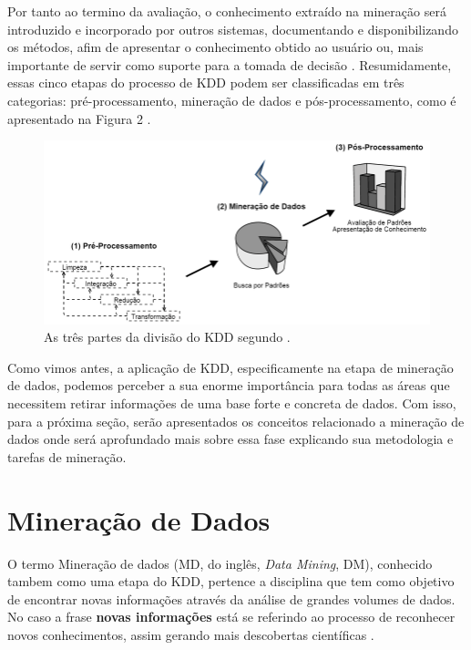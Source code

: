 \par
Por tanto ao termino da avaliação, o conhecimento extraído na mineração será introduzido e incorporado por outros sistemas, documentando e disponibilizando os métodos, afim  de apresentar o conhecimento obtido ao usuário ou, mais importante de servir como suporte para a tomada de decisão \cite{Kampff2013}. Resumidamente, essas cinco etapas do processo de KDD podem ser classificadas em três categorias: pré-processamento, mineração de dados e pós-processamento, como é apresentado na Figura 2 \cite{Fayyad1996}.

\begin{figure}[!htp]
	\begin{center}
    \caption{\label{fig:waveform_fig}As três partes da divisão do KDD segundo \cite{Fayyad1996}.}
	\includegraphics[scale=0.55]{Figuras/Tres_partes_KDD.png}
	\end{center}
\end{figure}

\par
Como vimos antes, a aplicação de KDD, especificamente na etapa de mineração de dados, podemos perceber a sua enorme importância para todas as áreas que necessitem retirar informações de uma base forte e concreta de dados. Com isso, para a próxima seção, serão apresentados os conceitos relacionado a mineração de dados onde será aprofundado mais sobre essa fase explicando sua metodologia e tarefas de mineração.




\section{Mineração de Dados}

O termo Mineração de dados (MD, do inglês, \textit{Data Mining}, DM), conhecido tambem como uma etapa do KDD, pertence a disciplina que tem como objetivo de encontrar novas informações através da análise de grandes volumes de dados. No caso a frase \textbf{novas informações} está se referindo ao processo de reconhecer novos conhecimentos, assim gerando mais descobertas científicas \cite{Baker2011}.

